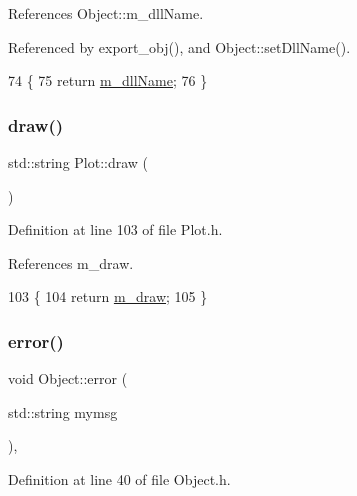 References Object\+::m\+\_\+dll\+Name.



Referenced by export\+\_\+obj(), and Object\+::set\+Dll\+Name().


\begin{DoxyCode}
74                        \{
75     \textcolor{keywordflow}{return} \hyperlink{classObject_a01afbeacebb8db6831559972ec362eb3}{m\_dllName};
76   \}  
\end{DoxyCode}
\mbox{\label{classPlot_aa49856f69c852f7f0ba65ed6131b7b61}} 
\subsubsection{\texorpdfstring{draw()}{draw()}}
{\footnotesize\ttfamily std\+::string Plot\+::draw (\begin{DoxyParamCaption}{ }\end{DoxyParamCaption})\hspace{0.3cm}{\ttfamily [inline]}}



Definition at line 103 of file Plot.\+h.



References m\+\_\+draw.


\begin{DoxyCode}
103                   \{
104     \textcolor{keywordflow}{return} \hyperlink{classPlot_a83ffbf3effe6a2f8befa6375882f3994}{m\_draw};
105   \}
\end{DoxyCode}
\mbox{\label{classObject_a204a95f57818c0f811933917a30eff45}} 
\subsubsection{\texorpdfstring{error()}{error()}\hspace{0.1cm}{\footnotesize\ttfamily [1/2]}}
{\footnotesize\ttfamily void Object\+::error (\begin{DoxyParamCaption}\item[{std\+::string}]{mymsg }\end{DoxyParamCaption})\hspace{0.3cm}{\ttfamily [inline]}, {\ttfamily [inherited]}}



Definition at line 40 of file Object.\+h.



